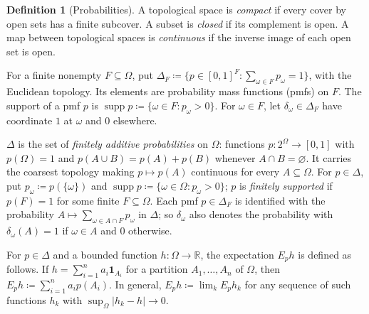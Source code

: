 \documentclass[11pt]{article}
\theoremstyle{definition}
\newtheorem{definition}[theorem]{Definition}
\theoremstyle{remark}
\newcommand{\supp}{\operatorname{supp}}
\begin{document}
\begin{definition}[Probabilities]\label{def:priors}
{A topological space is \emph{compact} if every cover by open sets has a finite subcover. A subset is \emph{closed} if its complement is open. A map between topological spaces is \emph{continuous} if the inverse image of each open set is open.}

For a finite nonempty $F\subseteq\Omega$, put $\Delta_F\coloneqq\{p\in[0,1]^F:\sum_{\omega\in F}p_\omega=1\}$, with the Euclidean topology. Its elements are probability mass functions (pmfs) on $F$. The support of a pmf $p$ is $\supp p\coloneqq\{\omega\in F:p_\omega>0\}$. For $\omega\in F$, let $\delta_\omega\in\Delta_F$ have coordinate $1$ at $\omega$ and $0$ elsewhere.

{$\Delta$ is the set of \emph{finitely additive probabilities} on $\Omega$: functions $p:2^\Omega\to[0,1]$ with $p(\Omega)=1$ and $p(A\cup B)=p(A)+p(B)$ whenever $A\cap B=\varnothing$. It carries the coarsest topology making $p\mapsto p(A)$ continuous for every $A\subseteq\Omega$. For $p\in\Delta$, put $p_\omega\coloneqq p(\{\omega\})$ and $\supp p\coloneqq\{\omega\in\Omega:p_\omega>0\}$; $p$ is \emph{finitely supported} if $p(F)=1$ for some finite $F\subseteq\Omega$. Each pmf $p\in\Delta_F$ is identified with the probability $A\mapsto\sum_{\omega\in A\cap F}p_\omega$ in $\Delta$; so $\delta_\omega$ also denotes the probability with $\delta_\omega(A)=1$ if $\omega\in A$ and $0$ otherwise.

For $p\in\Delta$ and a bounded function $h:\Omega\to\mathbb R$, the expectation $E_ph$ is defined as follows. If $h=\sum_{i=1}^na_i\mathbf 1_{A_i}$ for a partition $A_1,\dots,A_n$ of $\Omega$, then $E_ph\coloneqq\sum_{i=1}^na_ip(A_i)$. In general, $E_ph\coloneqq\lim_kE_ph_k$ for any sequence of such functions $h_k$ with $\sup_\Omega|h_k-h|\to0$.}
\end{definition}
\end{document}
